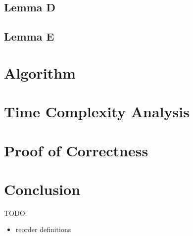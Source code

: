 \documentclass[manuscript]{acmart}
\begin{document}
    \subsection{Lemma D}
    \subsection{Lemma E}

    \section{Algorithm}

    \section{Time Complexity Analysis}

    \section{Proof of Correctness}

    \section{Conclusion}

    TODO:
    \begin{itemize}
        \item reorder definitions 
    \end{itemize}
\end{document}
